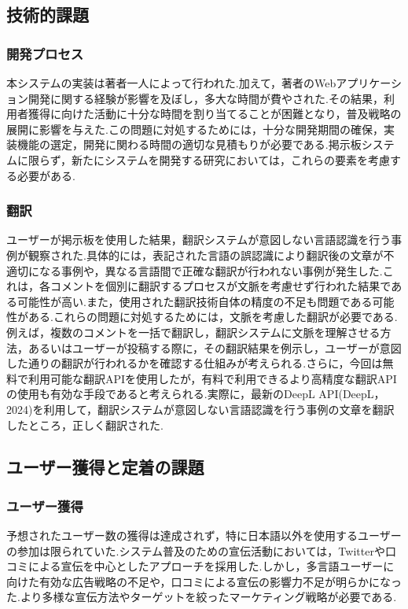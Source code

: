 \documentclass[b5paper,12pt,dvipdfmx]{jsreport}
\begin{document}
\subsection{技術的課題}

\subsubsection{開発プロセス}
本システムの実装は著者一人によって行われた.加えて，著者のWebアプリケーション開発に関する経験が影響を及ぼし，多大な時間が費やされた.その結果，利用者獲得に向けた活動に十分な時間を割り当てることが困難となり，普及戦略の展開に影響を与えた.この問題に対処するためには，十分な開発期間の確保，実装機能の選定，開発に関わる時間の適切な見積もりが必要である.掲示板システムに限らず，新たにシステムを開発する研究においては，これらの要素を考慮する必要がある.

\subsubsection{翻訳}
ユーザーが掲示板を使用した結果，翻訳システムが意図しない言語認識を行う事例が観察された.具体的には，表記された言語の誤認識により翻訳後の文章が不適切になる事例や，異なる言語間で正確な翻訳が行われない事例が発生した.これは，各コメントを個別に翻訳するプロセスが文脈を考慮せず行われた結果である可能性が高い.また，使用された翻訳技術自体の精度の不足も問題である可能性がある.これらの問題に対処するためには，文脈を考慮した翻訳が必要である.例えば，複数のコメントを一括で翻訳し，翻訳システムに文脈を理解させる方法，あるいはユーザーが投稿する際に，その翻訳結果を例示し，ユーザーが意図した通りの翻訳が行われるかを確認する仕組みが考えられる.さらに，今回は無料で利用可能な翻訳APIを使用したが，有料で利用できるより高精度な翻訳APIの使用も有効な手段であると考えられる.実際に，最新のDeepL API(DeepL，2024)を利用して，翻訳システムが意図しない言語認識を行う事例の文章を翻訳したところ，正しく翻訳された.


\subsection{ユーザー獲得と定着の課題}

\subsubsection{ユーザー獲得}
予想されたユーザー数の獲得は達成されず，特に日本語以外を使用するユーザーの参加は限られていた.システム普及のための宣伝活動においては，Twitterや口コミによる宣伝を中心としたアプローチを採用した.しかし，多言語ユーザーに向けた有効な広告戦略の不足や，口コミによる宣伝の影響力不足が明らかになった.より多様な宣伝方法やターゲットを絞ったマーケティング戦略が必要である.
\end{document}

